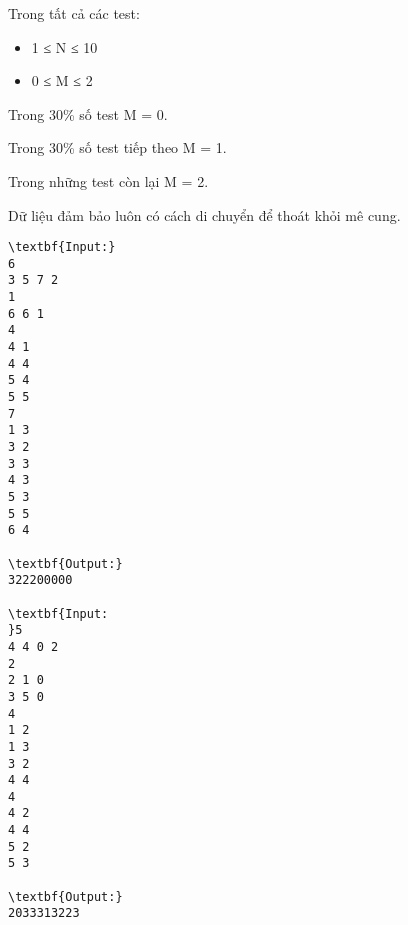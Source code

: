 Trong tất cả các test:
\begin{itemize}
	\item 1 ≤ N ≤ 10
	\item 0 ≤ M ≤ 2
\end{itemize}

Trong 30\% số test M = 0.

Trong 30\% số test tiếp theo M = 1.

Trong những test còn lại M = 2.

Dữ liệu đảm bảo luôn có cách di chuyển để thoát khỏi mê cung.
\begin{verbatim}
\textbf{Input:}
6
3 5 7 2
1
6 6 1
4 
4 1
4 4
5 4
5 5
7
1 3
3 2
3 3
4 3
5 3
5 5
6 4

\textbf{Output:}
322200000
 
\textbf{Input:
}5
4 4 0 2
2
2 1 0
3 5 0
4
1 2
1 3
3 2
4 4
4
4 2
4 4
5 2
5 3

\textbf{Output:}
2033313223\end{verbatim}